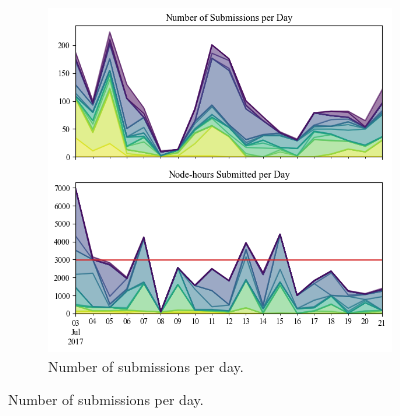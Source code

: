 \documentclass[a4paper,fleqn]{cas-dc}
\begin{document}
\begin{figure}[tbp]
\centering

\begin{subfigure}[t]{0.8\linewidth}
    \centering
    \includegraphics[clip,width=\linewidth,trim={0.1cm 8.3cm 0.1cm 0.75cm}]{figures/submissions.png}
    \caption{Number of submissions per day.}
    \label{fig:wl_distrib_sub_top}
\end{subfigure}

\vspace{1em} %


\end{figure}
\end{document}
